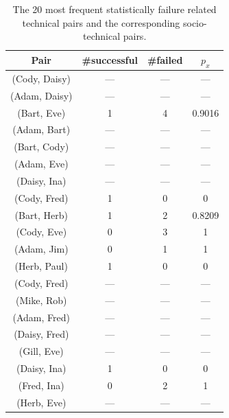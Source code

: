 \begin{table}[t]
\centering
\begin{tabular}{@{\hspace{.2cm}}ccc@{\hspace{.75cm}}c@{\hspace{.2cm}}}
\toprule
Pair & \#successful & \#failed & $p_x$ \\
\midrule
(Cody, Daisy)	&	---&	---&	---\\
(Adam, Daisy)	&	---&	---&	---\\
(Bart, Eve)	&	1&	4&	0.9016\\
(Adam, Bart)	&	---&	---&	---\\
(Bart, Cody)	&	---&	---&	---\\
(Adam, Eve)	&	---&	---&	---\\
(Daisy, Ina)	&	---&	---&	---\\
(Cody, Fred)	&	1&	0&	0\\
(Bart, Herb)	&	1&	2&	0.8209\\
(Cody, Eve)	&	0&	3&	1\\
(Adam, Jim)	&	0&	1&	1\\
(Herb, Paul)	&	1&	0&	0\\
(Cody, Fred)	&	---&	---&	---\\
(Mike, Rob)	&	---&	---&	---\\
(Adam, Fred)	&	---&	---&	---\\
(Daisy, Fred)	&	---&	---&	---\\
(Gill, Eve)		&	---&	---&	---\\
(Daisy, Ina)	&	1&	0&	0\\
(Fred, Ina)	&	0&	2&	1\\
(Herb, Eve)	&	---&	---&	---\\
\bottomrule
\end{tabular}
\label{tab:stechpairs}
\caption{The 20 most frequent statistically failure related technical pairs and the corresponding socio-technical pairs.}
\end{table}




